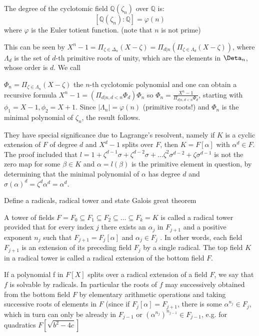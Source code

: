 The degree of the cyclotomic field \(\mathbb{Q}(\zeta_n)\) over \(\mathbb{Q}\) is:
\[ [\mathbb{Q}(\zeta_n) : \mathbb{Q}] = \varphi(n) \]
where \(\varphi\) is the Euler totient function. (note that \(n\) is not prime)


This can be seen by
\(X^{n} - 1 = \Pi_{\zeta \in \Delta_n} (X - \zeta) = \Pi_{d|n}(\Pi_{\zeta \in \Lambda_d} (X - \zeta))\), where \(\Lambda_d\) is the set of \(d\)-th primitive roots of unity,
which are the elements in \(\Deta_n\), whose order is \(d\). We call

\(\Phi_n = \Pi_{\zeta \in \Lambda_n} (X - \zeta)\) the \(n\)-th cyclotomic polynomial and one can obtain a recursive formula
\(X^{n} - 1 = (\Pi_{d|n, d<n} \Phi_d)\Phi_n\) so \(\Phi_n = \frac{X^{n} - 1}{\Pi_{d|n, d<n} \Phi_d}\), starting with \(\phi_1 = X - 1, \phi_2 = X + 1\).
Since \(|\Lambda_n| = \varphi(n)\) (primitive roots!) and \(\Phi_n\) is the minimal polynomial of \(\zeta_n\), the result follows.

They have special significance due to Lagrange's resolvent, namely if \(K\) is a cyclic extension of \(F\) of degree \(d\)
and \(X^{d} - 1\) splits over \(F\), then \(K = F[\alpha]\) with \(\alpha^{d} \in F\).
The proof included that \(l = 1 + \zeta^{d-1}\sigma + \zeta^{d-2}\sigma + \dots \zeta^2 \sigma^{d - 2} + \zeta\sigma^{d-1}\) is not the zero map for some \(\beta \in K\)
and \(\alpha = l(\beta)\) is the primitive element in question, by determining that the minimal polynomial of \(\alpha\) has degree \(d\) and \(\sigma(\alpha)^{d} = \zeta^{d}\alpha^{d} = \alpha^{d}\). 


Define a radicals, radical tower and state Galois great theorem

A tower of fields
\(F = F_0 \subseteq F_1 \subseteq F_2 \subseteq \dots \subseteq F_k = K\)
is called a radical tower provided that for every index \(j\) there exists an \(\alpha_j\) in \(F_{j+1}\) and a positive
exponent \(n_j\) such that
\(F_{j+1} = F_j[\alpha]\) and \(\alpha_j \in F_j\)  .
In other words, each field \(F_{j+1}\) is an extension of its preceding field \(F_j\) by a single radical. The
top field \(K\) in a radical tower is called a radical extension of the bottom field \(F\).

If a polynomial f in \(F[X]\) splits over a radical extension of a field \(F\), we say
that \(f\) is solvable by radicals. In particular the roots of \(f\) may successively obtained
from the bottom field \(F\) by elementary arithmetic operations and taking successive roots of elements
in \(F\) (since if \(F_j[\alpha] = F_{j+1}\), there is some \(\alpha^{n_j} \in F_j\), which in turn can only
be already in \(F_{j-1}\) or \((\alpha^{n_j})^{n_{j-1}} \in F_{j-1}\), e.g. for quadratics \(F[\sqrt{b^2 - 4c}]\)

